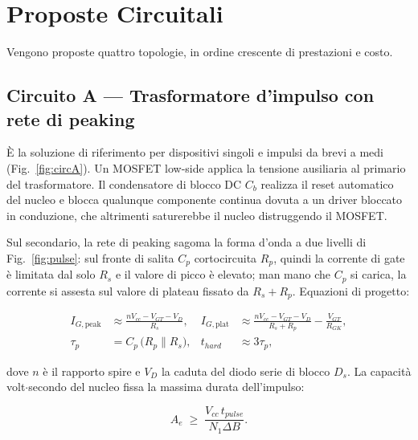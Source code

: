\documentclass[11pt,a4paper]{article}
\begin{document}
\section{Proposte Circuitali}

Vengono proposte quattro topologie, in ordine crescente di prestazioni e costo.

\subsection{Circuito A --- Trasformatore d'impulso con rete di peaking}

È la soluzione di riferimento per dispositivi singoli e impulsi da brevi a medi
(Fig.~\ref{fig:circA}). Un MOSFET low-side applica la tensione ausiliaria al
primario del trasformatore. Il condensatore di blocco DC $C_b$ realizza il reset
automatico del nucleo e blocca qualunque componente continua dovuta a un driver
bloccato in conduzione, che altrimenti saturerebbe il nucleo distruggendo il MOSFET.

Sul secondario, la rete di peaking sagoma la forma d'onda a due livelli di
Fig.~\ref{fig:pulse}: sul fronte di salita $C_p$ cortocircuita $R_p$, quindi la
corrente di gate è limitata dal solo $R_s$ e il valore di picco è elevato; man mano
che $C_p$ si carica, la corrente si assesta sul valore di plateau fissato da
$R_s + R_p$. Equazioni di progetto:

\begin{align}
  I_{G,\text{peak}} &\approx \frac{n V_{cc} - V_{GT} - V_{D}}{R_s},
  &
  I_{G,\text{plat}} &\approx \frac{n V_{cc} - V_{GT} - V_{D}}{R_s + R_p}
      - \frac{V_{GT}}{R_{GK}},
  \label{eq:peak}\\[1mm]
  \tau_p &= C_p\,\big(R_p \parallel R_s\big),
  &
  t_{hard} &\approx 3\tau_p ,
\end{align}

dove $n$ è il rapporto spire e $V_D$ la caduta del diodo serie di blocco $D_s$. La
capacità volt$\cdot$secondo del nucleo fissa la massima durata dell'impulso:

\begin{equation}
  A_e \;\ge\; \frac{V_{cc}\, t_{pulse}}{N_1 \Delta B}.
  \label{eq:volt-sec}
\end{equation}
\end{document}

